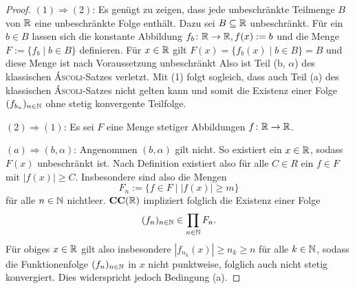 \begin{proof}
  $(1) \Rightarrow (2)$:
  Es genügt zu zeigen, dass jede unbeschränkte Teilmenge $B$ von $\mathbb{R}$ eine unbeschränkte Folge enthält.
  Dazu sei $B \subseteq \mathbb{R}$ unbeschränkt.
  Für ein $b \in B$ lassen sich die konstante Abbildung $f_b \colon \mathbb{R} \to \mathbb{R}, f(x):= b$ und die Menge $F := \{f_b \mid b \in B\}$ definieren.
  Für $x \in \mathbb{R}$ gilt $F(x) = \{f_b(x) \mid b \in B\} = B$ und diese Menge ist nach Voraussetzung unbeschränkt
  Also ist Teil (b, $\alpha$) des klassischen \textsc{Áscoli}-Satzes verletzt.
  Mit (1) folgt sogleich, dass auch Teil (a) des klassischen \textsc{Áscoli}-Satzes nicht gelten kann und somit die Existenz einer Folge $(f_{b_n})_{n \in \mathbb{N}}$ ohne stetig konvergente Teilfolge.

  $(2) \Rightarrow (1)$:
  Es sei $F$ eine Menge stetiger Abbildungen $f \colon \mathbb{R} \to \mathbb{R}$.

  $(a) \Rightarrow (b,\alpha)$:
  Angenommen $(b,\alpha)$ gilt nicht. So existiert ein $x \in \mathbb{R}$, sodass $F(x)$ unbeschränkt ist.
  Nach Definition existiert also für alle $C \in R$ ein $f \in F$ mit $|f(x)| \geq C$.
  Insbesondere sind also die Mengen 
  \begin{displaymath}
    F_n := \{ f \in F \mid |f(x)| \geq m \}
  \end{displaymath}
  für alle $n \in \mathbb{N}$ nichtleer.
  $\mathbf{CC}(\mathbb{R})$ impliziert folglich die Existenz einer Folge 
  \begin{displaymath}
    (f_n)_{n \in \mathbb{N}} \in \prod_{n \in \mathbb{N}} F_n.
  \end{displaymath}
  Für obiges $x \in \mathbb{R}$ gilt also insbesondere $|f_{n_k}(x)| \geq n_k \geq n$ für alle $k \in \mathbb{N}$, sodass die Funktionenfolge $(f_n)_{n \in \mathbb{N}}$ in $x$ nicht punktweise, folglich auch nicht stetig konvergiert.
  Dies widerspricht jedoch Bedingung (a).


\end{proof}
